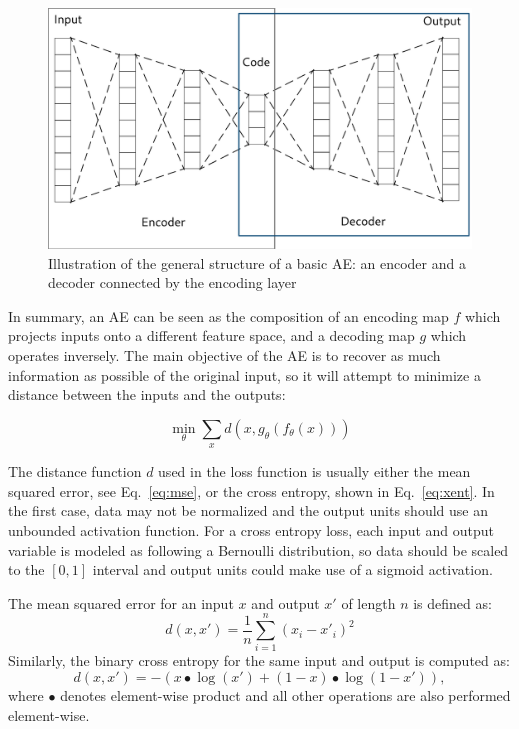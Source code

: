 \begin{figure}[ht]
    \centering
    \includegraphics[width=\linewidth]{autoencoder.png}
    \caption{Illustration of the general structure of a basic AE: an encoder and a decoder connected by the encoding layer}
    \label{p5fig:ae}
\end{figure}

In summary, an AE can be seen as the composition of an encoding map $f$ which projects inputs onto a different feature space, and a decoding map $g$ which operates inversely. The main objective of the AE is to recover as much information as possible of the original input, so it will attempt to minimize a distance between the inputs and the outputs:

\begin{equation}\label{p5eq:objective}
\min_{\theta} \sum_{x}d(x, g_{\theta}(f_{\theta}(x)))
\end{equation}

The distance function $d$ used in the loss function is usually either the mean squared error, see Eq.~\eqref{eq:mse}, or the cross entropy, shown in  Eq.~\eqref{eq:xent}. In the first case, data may not be normalized and the output units should use an unbounded activation function. For a cross entropy loss, each input and output variable is modeled as following a Bernoulli distribution, so data should be scaled to the $[0,1]$ interval and output units could make use of a sigmoid activation.

The mean squared error for an input $x$ and output $x'$ of length $n$ is defined as:
\begin{equation}\label{p5eq:mse}
    d(x, x') = \frac 1 n\sum_{i=1}^n(x_i - x'_i)^2
\end{equation}
Similarly, the binary cross entropy for the same input and output is computed as:
\begin{equation}\label{p5eq:xent}
    d(x, x') = - (x \bullet \log(x') + (1-x)\bullet \log(1-x')),
\end{equation}
where $\bullet$ denotes element-wise product and all other operations are also performed element-wise.


